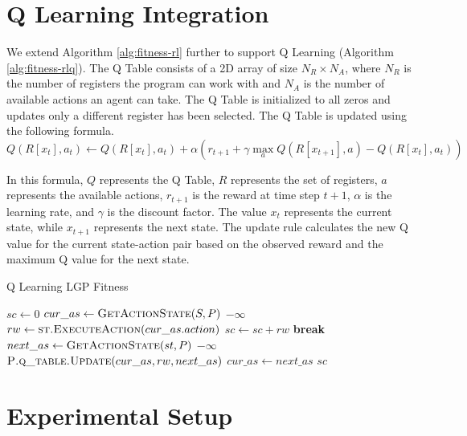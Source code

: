 \documentclass[12pt, final]{dalcsthesis}
\begin{document}
\section{Q Learning Integration}
We extend Algorithm \ref{alg:fitness-rl} further to support Q Learning (Algorithm \ref{alg:fitness-rlq}).
The Q Table consists of a 2D array of size $N_R \times N_A$, where $N_R$ is the number of registers the program can work with and $N_A$ is the number of available actions an agent can take. The Q Table is initialized to all zeros and updates only a different register has been selected. The Q Table is updated using the following formula.
\begin{equation}
	Q(R[x_t], a_t) \leftarrow Q(R[x_t], a_t) + \alpha \left(r_{t+1} + \gamma \max_a Q(R[x_{t+1}], a) - Q(R[x_t], a_t)\right)
\end{equation}

In this formula, $Q$ represents the Q Table, $R$ represents the set of registers, $a$ represents the available actions, $r_{t+1}$ is the reward at time step $t+1$, $\alpha$ is the learning rate, and $\gamma$ is the discount factor. The value $x_t$ represents the current state, while $x_{t+1}$ represents the next state. The update rule calculates the new Q value for the current state-action pair based on the observed reward and the maximum Q value for the next state.

\begin{algorithm}[hb]
	\caption{Q Learning LGP Fitness}
	\label{alg:fitness-rlq}
	\begin{algorithmic}[1]
		\State $sc \gets 0$
		\State $cur\_as \gets \Call{GetActionState}{S, P}$
		\State \Return $-\infty$
		\EndIf
		\State $rw \gets \Call{st.ExecuteAction}{cur\_as.action}$
		\State $sc \gets sc + rw$
		\State \textbf{break}
		\EndIf
		\State $next\_as \gets \Call{GetActionState}{st, P}$
		\State \Return $-\infty$
		\EndIf
		\State $\Call{P.q\_table.Update}{cur\_as, rw, next\_as}$
		\EndIf
		\State $cur\_as \gets next\_as$
		\EndWhile
		\State \Return $sc$
		\EndFunction
	\end{algorithmic}
\end{algorithm}

\section{Experimental Setup}
\end{document}
